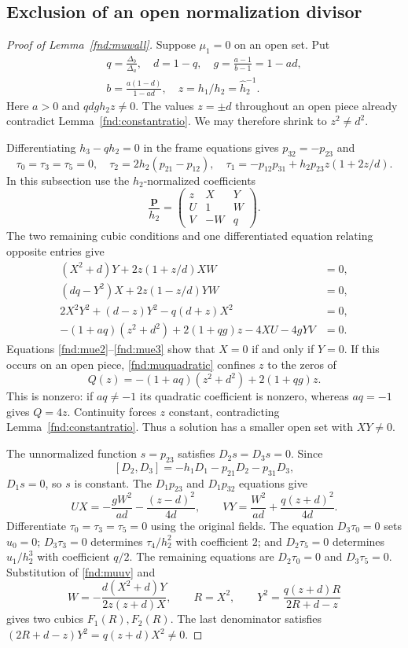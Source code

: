 \documentclass[11pt,a4paper]{article}
\numberwithin{equation}{section}
\theoremstyle{plain}
\theoremstyle{definition}
\theoremstyle{remark}
\begin{document}
\subsection{Exclusion of an open normalization divisor}
\label{appn:mugeometry}
\begin{proof}[Proof of Lemma~\ref{fnd:muwall}]
Suppose $\mu_1=0$ on an open set. Put
\[
\begin{gathered}
q=\frac{\Delta_b}{\Delta_a},\quad d=1-q,\quad g=\frac{a-1}{b-1}=1-ad,\\
b=\frac{a(1-d)}{1-ad},\quad z=h_1/h_2=\widehat h_2^{-1}.
\end{gathered}
\]
Here $a>0$ and $qdgh_2z\ne0$. The values $z=\pm d$ throughout an open piece already contradict Lemma~\ref{fnd:constantratio}. We may therefore shrink to $z^2\ne d^2$.

Differentiating $h_3-qh_2=0$ in the frame equations gives $p_{32}=-p_{23}$ and
\[
\tau_0=\tau_3=\tau_5=0,\quad \tau_2=2h_2(p_{21}-p_{12}),\quad
\tau_1=-p_{12}p_{31}+h_2p_{23}z(1+2z/d).
\]
In this subsection use the $h_2$-normalized coefficients
\[
\frac{\boldsymbol p}{h_2}=\begin{pmatrix}z&X&Y\\ U&1&W\\ V&-W&q\end{pmatrix}.
\]
The two remaining cubic conditions and one differentiated equation relating opposite entries give
\begin{align}
(X^2+d)Y+2z(1+z/d)XW&=0,\label{fnd:mue2}\\
(dq-Y^2)X+2z(1-z/d)YW&=0,\label{fnd:mue3}\\
2X^2Y^2+(d-z)Y^2-q(d+z)X^2&=0,\label{fnd:mubiquad}\\
-(1+aq)(z^2+d^2)+2(1+qg)z-4XU-4gYV&=0.\label{fnd:muquadratic}
\end{align}
Equations \eqref{fnd:mue2}--\eqref{fnd:mue3} show that $X=0$ if and only if $Y=0$. If this occurs on an open piece, \eqref{fnd:muquadratic} confines $z$ to the zeros of
\[
Q(z)=-(1+aq)(z^2+d^2)+2(1+qg)z.
\]
This is nonzero: if $aq\ne-1$ its quadratic coefficient is nonzero, whereas $aq=-1$ gives $Q=4z$. Continuity forces $z$ constant, contradicting Lemma~\ref{fnd:constantratio}. Thus a solution has a smaller open set with $XY\ne0$.

The unnormalized function $s=p_{23}$ satisfies $D_2s=D_3s=0$. Since
\[
[D_2,D_3]=-h_1D_1-p_{21}D_2-p_{31}D_3,
\]
$D_1s=0$, so $s$ is constant. The $D_1p_{23}$ and $D_1p_{32}$ equations give
\begin{equation}\label{fnd:muuv}
UX=-\frac{gW^2}{ad}-\frac{(z-d)^2}{4d},\qquad
VY=\frac{W^2}{ad}+\frac{q(z+d)^2}{4d}.
\end{equation}
Differentiate $\tau_0=\tau_3=\tau_5=0$ using the original fields. The equation $D_3\tau_0=0$ sets $u_0=0$; $D_3\tau_3=0$ determines $\tau_4/h_2^2$ with coefficient $2$; and $D_2\tau_5=0$ determines $u_1/h_2^3$ with coefficient $q/2$. The remaining equations are $D_2\tau_0=0$ and $D_3\tau_5=0$. Substitution of \eqref{fnd:muuv} and
\[
W=-\frac{d(X^2+d)Y}{2z(z+d)X},\qquad R=X^2,\qquad
Y^2=\frac{q(z+d)R}{2R+d-z}
\]
gives two cubics $F_1(R),F_2(R)$. The last denominator satisfies $(2R+d-z)Y^2=q(z+d)X^2\ne0$.


\end{proof}
\end{document}
